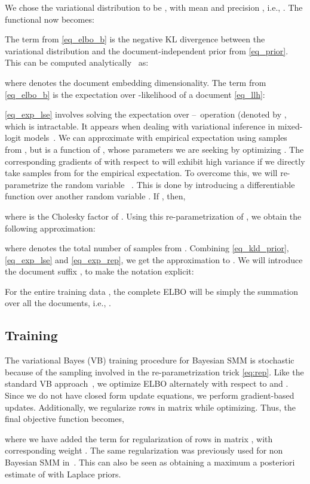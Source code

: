 \documentclass[journal]{IEEEtran}
\newcommand{\lse}{--}      \newcommand{\Dir}{}
\newcommand{\Gau}{}
\begin{document}
We chose the variational distribution  to be \Gau, with mean  and precision , i.e., . The functional  now becomes:

The term  from \eqref{eq_elbo_b} is the negative
KL divergence between the variational distribution 
and the document-independent prior from \eqref{eq_prior}. This can be 
computed analytically~\cite{cookbook} as:

where  denotes the document embedding dimensionality. The term 
 from \eqref{eq_elbo_b} is the expectation over
-likelihood of a document \eqref{eq_llh}:

\eqref{eq_exp_lse} involves solving the expectation over \lse~operation 
(denoted by , which is intractable. It appears when dealing 
with variational inference in mixed-logit 
models~\cite{Blei:2005:CTM,Depraetere:2017:mixed}. We can approximate 
 with empirical expectation using samples from , 
but  is a function of , whose parameters we are 
seeking by optimizing . The corresponding gradients of 
 with respect to  will exhibit high variance if 
we directly take samples from  for the empirical expectation. To 
overcome this, we will re-parametrize the random variable 
~\cite{Kingma:2014:AEVB}. This is done by introducing a 
differentiable function  over another random variable . 
If , then,

where  is the Cholesky factor of .
Using this re-parametrization of , we obtain the following approximation:

where  denotes the total number of samples  
from .
Combining \eqref{eq_kld_prior},\eqref{eq_exp_lse} and \eqref{eq_exp_rep}, 
we get the approximation to . We will introduce the document 
suffix , to make the notation explicit:

For the entire training data , the complete ELBO will be simply the summation over all the documents, i.e., .
\subsection{Training}
\label{ssec:vb_training}
The variational Bayes (VB) training procedure for Bayesian SMM is stochastic 
because of the sampling involved in the re-parametrization trick
\eqref{eq:rep}. Like the standard VB approach~\cite{Bishop:2006:PRML}, we 
optimize ELBO alternately with respect to  and . Since we do not have closed form update equations, we perform 
gradient-based updates. Additionally, we regularize rows in matrix  
while optimizing. Thus, the final objective function becomes,

where we have added the term for  regularization of rows in matrix 
, with corresponding weight . The same regularization was 
previously used for non Bayesian SMM in~\cite{Kesiraju:2016:SMM}. This can also 
be seen as obtaining a maximum a posteriori estimate of  with Laplace 
priors.
\end{document}
